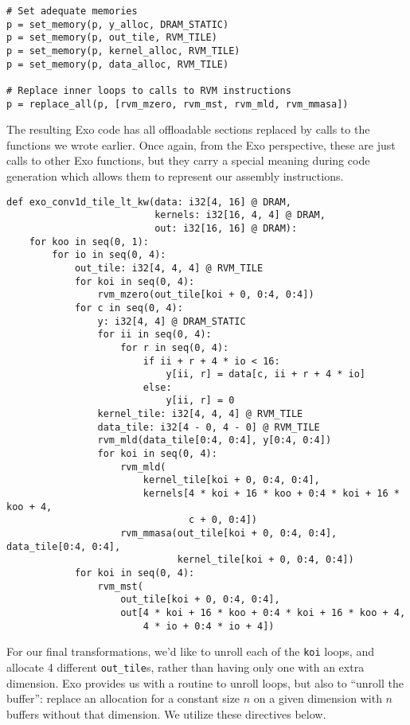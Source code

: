 \documentclass[acmsmall, nonacm=true]{acmart}
\begin{document}
\begin{verbatim}
# Set adequate memories
p = set_memory(p, y_alloc, DRAM_STATIC)
p = set_memory(p, out_tile, RVM_TILE)
p = set_memory(p, kernel_alloc, RVM_TILE)
p = set_memory(p, data_alloc, RVM_TILE)

# Replace inner loops to calls to RVM instructions
p = replace_all(p, [rvm_mzero, rvm_mst, rvm_mld, rvm_mmasa])
\end{verbatim}
The resulting Exo code has all offloadable sections replaced by calls to the functions we wrote earlier. Once again, from the Exo perspective, these are just calls to other Exo functions, but they carry a special meaning during code generation which allows them to represent our assembly instructions. 

\begin{verbatim}
def exo_conv1d_tile_lt_kw(data: i32[4, 16] @ DRAM,
                          kernels: i32[16, 4, 4] @ DRAM,
                          out: i32[16, 16] @ DRAM):
    for koo in seq(0, 1):
        for io in seq(0, 4):
            out_tile: i32[4, 4, 4] @ RVM_TILE
            for koi in seq(0, 4):
                rvm_mzero(out_tile[koi + 0, 0:4, 0:4])
            for c in seq(0, 4):
                y: i32[4, 4] @ DRAM_STATIC
                for ii in seq(0, 4):
                    for r in seq(0, 4):
                        if ii + r + 4 * io < 16:
                            y[ii, r] = data[c, ii + r + 4 * io]
                        else:
                            y[ii, r] = 0
                kernel_tile: i32[4, 4, 4] @ RVM_TILE
                data_tile: i32[4 - 0, 4 - 0] @ RVM_TILE
                rvm_mld(data_tile[0:4, 0:4], y[0:4, 0:4])
                for koi in seq(0, 4):
                    rvm_mld(
                        kernel_tile[koi + 0, 0:4, 0:4],
                        kernels[4 * koi + 16 * koo + 0:4 * koi + 16 * koo + 4,
                                c + 0, 0:4])
                    rvm_mmasa(out_tile[koi + 0, 0:4, 0:4], data_tile[0:4, 0:4],
                              kernel_tile[koi + 0, 0:4, 0:4])
            for koi in seq(0, 4):
                rvm_mst(
                    out_tile[koi + 0, 0:4, 0:4],
                    out[4 * koi + 16 * koo + 0:4 * koi + 16 * koo + 4,
                        4 * io + 0:4 * io + 4])
\end{verbatim}

For our final transformations, we'd like to unroll each of the \verb|koi| loops, and allocate 4 different \verb|out_tile|s, rather than having only one with an extra dimension. Exo provides us with a routine to unroll loops, but also to ``unroll the buffer'': replace an allocation for a constant size $n$ on a given dimension with $n$ buffers without that dimension. We utilize these directives below.
\end{document}
